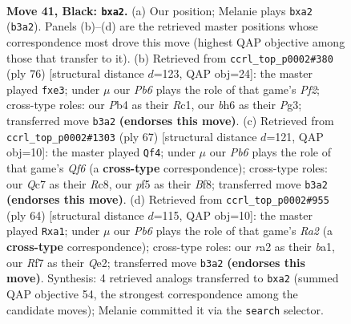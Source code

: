 \documentclass[11pt]{article}
\begin{document}
\clearpage

\begin{figure}[p]\centering
\begin{subfigure}{0.46\textwidth}\centering
\resizebox{\linewidth}{!}{%
\newchessgame
\chessboard[
  setfen={2b1k3/p1qn1r1p/1P3b1B/5P1N/1p1p4/1p6/R3P1Q1/1N1K2R1 b - - 0 41},
  showmover=false,
  pgfstyle=straightmove, color=movearrow, markmove={b3-a2}
]}
\caption{}
\end{subfigure}\hfill
\begin{subfigure}{0.46\textwidth}\centering
\resizebox{\linewidth}{!}{%
\newchessgame
\chessboard[
  setfen={1b3r1k/1p6/2B2qpp/PNP5/2Q5/4r1P1/5P1P/2R3K1 w - - 0 39},
  showmover=false,
  pgfstyle=straightmove, color=movearrow, markmove={f2-e3}
]}
\caption{}
\end{subfigure}
\\[4pt]
\begin{subfigure}{0.46\textwidth}\centering
\resizebox{\linewidth}{!}{%
\newchessgame
\chessboard[
  setfen={2r2b1k/5p1p/p2p1p2/1p6/6N1/P4q1r/1PPR4/1K2Q1R1 b - - 1 34},
  showmover=false,
  pgfstyle=straightmove, color=movearrow, markmove={f3-f4}
]}
\caption{}
\end{subfigure}\hfill
\begin{subfigure}{0.46\textwidth}\centering
\resizebox{\linewidth}{!}{%
\newchessgame
\chessboard[
  setfen={rr1q2k1/8/3n2p1/2pP1P1p/b1B1N3/N6P/R3QPP1/b5K1 w - - 0 33},
  showmover=false,
  pgfstyle=straightmove, color=movearrow, markmove={a2-a1}
]}
\caption{}
\end{subfigure}
\caption{\textbf{Move 41, Black: \texttt{bxa2}.} (a) Our position; Melanie plays \texttt{bxa2} (\texttt{b3a2}). Panels (b)--(d) are the retrieved master positions whose correspondence most drove this move (highest QAP objective among those that transfer to it). (b) Retrieved from \texttt{ccrl\_top\_p0002\#380} (ply 76) [structural distance $d$=123, QAP obj=24]: the master played \texttt{fxe3}; under $\mu$ our \emph{Pb6} plays the role of that game's \emph{Pf2}; cross-type roles: our \emph{P}b4 as their \emph{R}c1, our \emph{b}h6 as their \emph{P}g3; transferred move \texttt{b3a2} \textbf{(endorses this move)}. (c) Retrieved from \texttt{ccrl\_top\_p0002\#1303} (ply 67) [structural distance $d$=121, QAP obj=10]: the master played \texttt{Qf4}; under $\mu$ our \emph{Pb6} plays the role of that game's \emph{Qf6} (a \textbf{cross-type} correspondence); cross-type roles: our \emph{Q}c7 as their \emph{R}c8, our \emph{p}f5 as their \emph{B}f8; transferred move \texttt{b3a2} \textbf{(endorses this move)}. (d) Retrieved from \texttt{ccrl\_top\_p0002\#955} (ply 64) [structural distance $d$=115, QAP obj=10]: the master played \texttt{Rxa1}; under $\mu$ our \emph{Pb6} plays the role of that game's \emph{Ra2} (a \textbf{cross-type} correspondence); cross-type roles: our \emph{r}a2 as their \emph{b}a1, our \emph{R}f7 as their \emph{Q}e2; transferred move \texttt{b3a2} \textbf{(endorses this move)}. Synthesis: 4 retrieved analogs transferred to \texttt{bxa2} (summed QAP objective 54, the strongest correspondence among the candidate moves); Melanie committed it via the \texttt{search} selector.}
\label{fig:thought-m81}
\end{figure}
\end{document}

